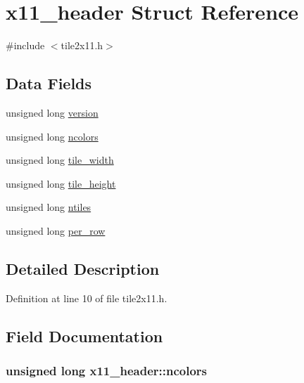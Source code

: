 \hypertarget{structx11__header}{\section{x11\+\_\+header Struct Reference}
\label{structx11__header}
}


{\ttfamily \#include $<$tile2x11.\+h$>$}

\subsection*{Data Fields}
\begin{DoxyCompactItemize}
\item 
unsigned long \hyperlink{structx11__header_afeb200c99dc3b2fd297b209c8ad9dd8d}{version}
\item 
unsigned long \hyperlink{structx11__header_a930cf64a8bb09d33c6ca0040b68d7876}{ncolors}
\item 
unsigned long \hyperlink{structx11__header_a7d80edb8d769660ce1149ffe41113e4e}{tile\+\_\+width}
\item 
unsigned long \hyperlink{structx11__header_a7fcb99ec6211c004413a72d551e5c30e}{tile\+\_\+height}
\item 
unsigned long \hyperlink{structx11__header_a76bec784f1a45a0ab46189cc413657e9}{ntiles}
\item 
unsigned long \hyperlink{structx11__header_a0093a0825169d5d844a12cf63462da41}{per\+\_\+row}
\end{DoxyCompactItemize}


\subsection{Detailed Description}


Definition at line 10 of file tile2x11.\+h.



\subsection{Field Documentation}
\hypertarget{structx11__header_a930cf64a8bb09d33c6ca0040b68d7876}{
\subsubsection[{ncolors}]{\setlength{\rightskip}{0pt plus 5cm}unsigned long x11\+\_\+header\+::ncolors}}\label{structx11__header_a930cf64a8bb09d33c6ca0040b68d7876}


